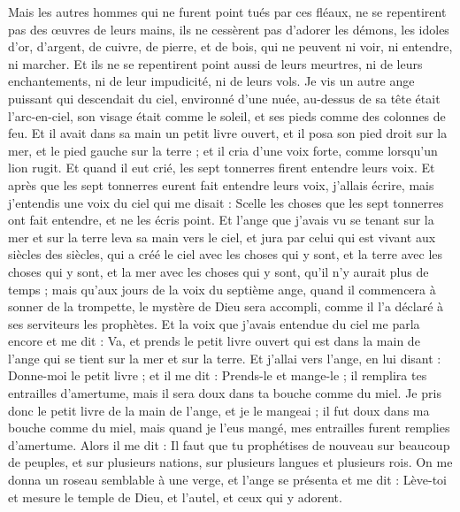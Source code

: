 \begin{multicols}{2}
Mais les autres hommes qui ne furent point tués par ces fléaux, ne se repentirent pas des œuvres de leurs mains, ils ne cessèrent pas d’adorer les démons, les idoles d'or, d'argent, de cuivre, de pierre, et de bois, qui ne peuvent ni voir, ni entendre, ni marcher.
Et ils ne se repentirent point aussi de leurs meurtres, ni de leurs enchantements, ni de leur impudicité, ni de leurs vols.
\VerseOne{}Je vis un autre ange puissant qui descendait du ciel, environné d'une nuée, au-dessus de sa tête était l'arc-en-ciel, son visage était comme le soleil, et ses pieds comme des colonnes de feu.
Et il avait dans sa main un petit livre ouvert, et il posa son pied droit sur la mer, et le pied gauche sur la terre ;
et il cria d’une voix forte, comme lorsqu'un lion rugit. Et quand il eut crié, les sept tonnerres firent entendre leurs voix.
Et après que les sept tonnerres eurent fait entendre leurs voix, j'allais écrire, mais j'entendis une voix du ciel qui me disait : Scelle les choses que les sept tonnerres ont fait entendre, et ne les écris point.
Et l'ange que j'avais vu se tenant sur la mer et sur la terre leva sa main vers le ciel,
et jura par celui qui est vivant aux siècles des siècles, qui a créé le ciel avec les choses qui y sont, et la terre avec les choses qui y sont, et la mer avec les choses qui y sont, qu'il n'y aurait plus de temps ;
mais qu'aux jours de la voix du septième ange, quand il commencera à sonner de la trompette, le mystère de Dieu sera accompli, comme il l'a déclaré à ses serviteurs les prophètes.
Et la voix que j'avais entendue du ciel me parla encore et me dit : Va, et prends le petit livre ouvert qui est dans la main de l'ange qui se tient sur la mer et sur la terre.
Et j’allai vers l'ange, en lui disant : Donne-moi le petit livre ; et il me dit : Prends-le et mange-le ; il remplira tes entrailles d'amertume, mais il sera doux dans ta bouche comme du miel.
Je pris donc le petit livre de la main de l'ange, et je le mangeai ; il fut doux dans ma bouche comme du miel, mais quand je l'eus mangé, mes entrailles furent remplies d'amertume.
Alors il me dit : Il faut que tu prophétises de nouveau sur beaucoup de peuples, et sur plusieurs nations, sur plusieurs langues et plusieurs rois.
\VerseOne{}On me donna un roseau semblable à une verge, et l’ange se présenta et me dit : Lève-toi et mesure le temple de Dieu, et l'autel, et ceux qui y adorent.

\end{multicols}
